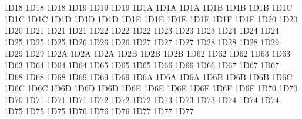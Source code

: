 \setcclcucx 1D18 1D18 1D18 %
\setcclcucx 1D19 1D19 1D19 %
\setcclcucx 1D1A 1D1A 1D1A %
\setcclcucx 1D1B 1D1B 1D1B %
\setcclcucx 1D1C 1D1C 1D1C %
\setcclcucx 1D1D 1D1D 1D1D %
\setcclcucx 1D1E 1D1E 1D1E %
\setcclcucx 1D1F 1D1F 1D1F %
\setcclcucx 1D20 1D20 1D20 %
\setcclcucx 1D21 1D21 1D21 %
\setcclcucx 1D22 1D22 1D22 %
\setcclcucx 1D23 1D23 1D23 %
\setcclcucx 1D24 1D24 1D24 %
\setcclcucx 1D25 1D25 1D25 %
\setcclcucx 1D26 1D26 1D26 %
\setcclcucx 1D27 1D27 1D27 %
\setcclcucx 1D28 1D28 1D28 %
\setcclcucx 1D29 1D29 1D29 %
\setcclcucx 1D2A 1D2A 1D2A %
\setcclcucx 1D2B 1D2B 1D2B %
\setcclcucx 1D62 1D62 1D62 %
\setcclcucx 1D63 1D63 1D63 %
\setcclcucx 1D64 1D64 1D64 %
\setcclcucx 1D65 1D65 1D65 %
\setcclcucx 1D66 1D66 1D66 %
\setcclcucx 1D67 1D67 1D67 %
\setcclcucx 1D68 1D68 1D68 %
\setcclcucx 1D69 1D69 1D69 %
\setcclcucx 1D6A 1D6A 1D6A %
\setcclcucx 1D6B 1D6B 1D6B %
\setcclcucx 1D6C 1D6C 1D6C %
\setcclcucx 1D6D 1D6D 1D6D %
\setcclcucx 1D6E 1D6E 1D6E %
\setcclcucx 1D6F 1D6F 1D6F %
\setcclcucx 1D70 1D70 1D70 %
\setcclcucx 1D71 1D71 1D71 %
\setcclcucx 1D72 1D72 1D72 %
\setcclcucx 1D73 1D73 1D73 %
\setcclcucx 1D74 1D74 1D74 %
\setcclcucx 1D75 1D75 1D75 %
\setcclcucx 1D76 1D76 1D76 %
\setcclcucx 1D77 1D77 1D77 %
